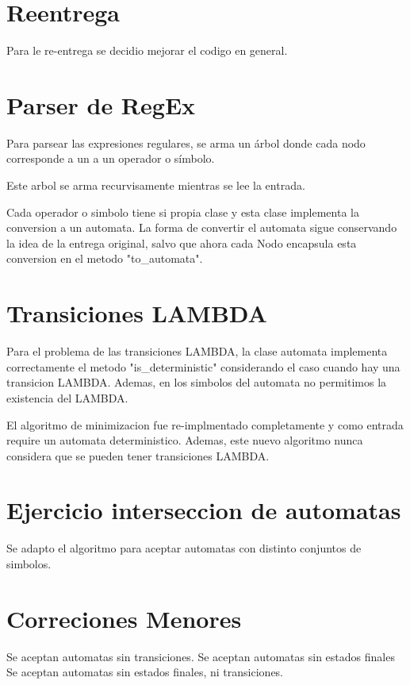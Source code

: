 
\section{Reentrega}

Para le re-entrega se decidio mejorar el codigo en general.

\section*{Parser de RegEx}

Para parsear las expresiones regulares, se arma un \'arbol donde cada nodo corresponde a un a un operador o s\'imbolo.

Este arbol se arma recurvisamente mientras se lee la entrada.

Cada operador o simbolo tiene si propia clase y esta clase
implementa la conversion a un automata.
La forma de convertir el automata sigue conservando la idea de la entrega original, salvo que ahora cada Nodo encapsula esta conversion en el metodo "to_automata".

\section{Transiciones LAMBDA}

Para el problema de las transiciones LAMBDA, la clase automata implementa correctamente el metodo "is_deterministic" considerando el caso cuando hay una transicion LAMBDA.
Ademas, en los simbolos del automata no permitimos la existencia del LAMBDA. 


El algoritmo de minimizacion fue re-implmentado completamente y como entrada require un automata deterministico.
Ademas, este nuevo algoritmo nunca considera que se pueden tener transiciones LAMBDA.

\section{Ejercicio interseccion de automatas}

Se adapto el algoritmo para aceptar automatas con distinto conjuntos de simbolos.

\section{Correciones Menores}

Se aceptan automatas sin transiciones.
Se aceptan automatas sin estados finales
Se aceptan automatas sin estados finales, ni transiciones.
